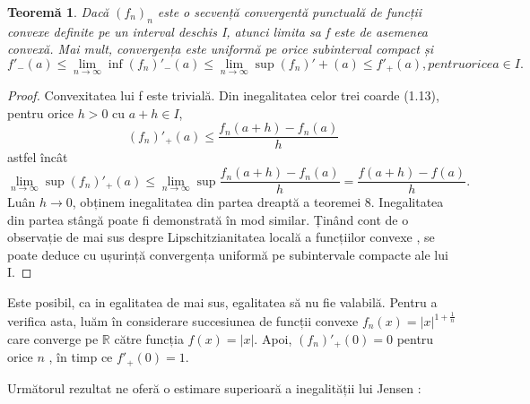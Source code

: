 \documentclass[a4paper,12pt,oneside]{report}
\newtheorem{theorem}{Teorem\u a}
\begin{document}
\begin{theorem}
Dacă \(\left ( f_{n} \right )_{n}\) este o secvență convergentă punctuală de funcții convexe definite pe un interval deschis I, atunci limita sa f este de asemenea convexă. Mai mult, convergența este uniformă pe orice subinterval compact și 
\begin{displaymath}
   {f}'_{-}\left ( a \right ) \leq \lim_{n\rightarrow \infty } \inf {\left (f_{n}  \right )}'_{-}\left ( a \right )\leq \lim_{n\rightarrow \infty }\sup {\left (f_{n}  \right )}' + \left ( a \right ) \leq {f}'_{+}\left ( a \right ), pentru orice a \in I. 
\end{displaymath}
\end{theorem}
\begin{proof}
Convexitatea lui f este trivială. Din inegalitatea celor trei coarde (1.13), pentru orice \(h >  0\) cu \(a + h \in I\),
\begin{displaymath}
   {\left (f_{n}  \right )}'_{+}\left ( a \right ) \leq  \frac{f_{n}\left ( a + h \right ) - f_{n}\left ( a \right )}{h}
\end{displaymath}
astfel încât  
\begin{displaymath}
   \lim_{n\rightarrow \infty } \sup {\left ( f_{n} \right )}'_{+}\left ( a \right ) \leq \lim_{n\rightarrow \infty } \sup \frac{f_{n}\left ( a + h \right ) - f_{n}\left ( a \right )}{h} = \frac{f\left ( a + h \right ) - f\left ( a \right )}{h}. 
\end{displaymath}
Luân \(h\rightarrow 0\), obținem inegalitatea din partea dreaptă a teoremei 8. Inegalitatea din partea stângă poate fi demonstrată în mod similar. Ținând cont de o observație de mai sus despre Lipschitzianitatea locală a  funcțiilor convexe , se poate deduce cu ușurință convergența uniformă pe subintervale compacte ale lui I. 
\end{proof}
Este posibil, ca in egalitatea de mai sus, egalitatea să nu fie valabilă. Pentru a verifica asta, luăm în considerare succesiunea de funcții convexe \(f_{n}\left ( x \right ) = \left | x \right |^{1 + \frac{1}{n}}\) care converge pe \(\mathbb{R}\) către funcția \(f\left ( x  \right ) = \left | x \right |.\) Apoi, \({\left ( f_{n} \right )}'_{+}\left ( 0 \right ) = 0\) pentru orice \(n\) , în timp ce \({f}'_{+}\left ( 0 \right ) = 1.\) 

Următorul rezultat ne oferă o estimare superioară a inegalității lui Jensen :
\end{document}
